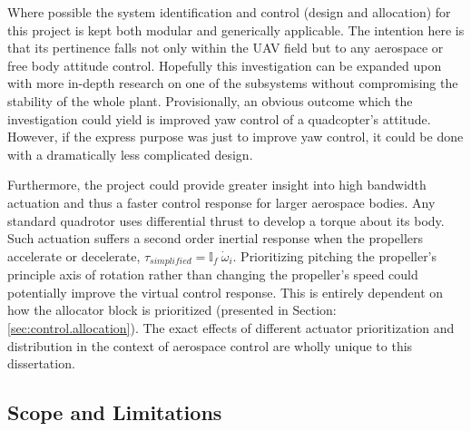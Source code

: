 \par
Where possible the system identification and control (design and allocation) for this project is kept both modular and generically applicable. The intention here is that its pertinence falls not only within the UAV field but to any aerospace or free body attitude control. Hopefully this investigation can be expanded upon with more in-depth research on one of the subsystems without compromising the stability of the whole plant. Provisionally, an obvious outcome which the investigation could yield is improved yaw control of a quadcopter's attitude. However, if the express purpose was just to improve yaw control, it could be done with a dramatically less complicated design.
\par
Furthermore, the project could provide greater insight into high bandwidth actuation and thus a faster control response for larger aerospace bodies. Any standard quadrotor uses differential thrust to develop a torque about its body. Such actuation suffers a second order inertial response when the propellers accelerate or decelerate, $\tau_{simplified}=\mathbb{I}_f~\dot{\omega}_{i}$. Prioritizing pitching the propeller's principle axis of rotation rather than changing the propeller's speed could potentially improve the virtual control response. This is entirely dependent on how the allocator block is prioritized (presented in Section:\ref{sec:control.allocation}). The exact effects of different actuator prioritization and distribution in the context of aerospace control are wholly unique to this dissertation.
\subsection{Scope and Limitations}
\label{subsec:intro.foreword.scopeandlim}
